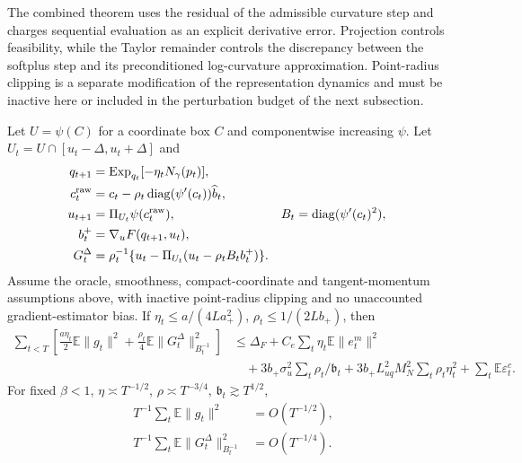 The combined theorem uses the residual of the admissible curvature step and charges sequential evaluation as an explicit derivative error. Projection controls feasibility, while the Taylor remainder controls the discrepancy between the softplus step and its preconditioned log-curvature approximation. Point-radius clipping is a separate modification of the representation dynamics and must be inactive here or included in the perturbation budget of the next subsection.

\begin{theorem}
\label{thm:rigid-implemented-curvature}
Let $U=\psi(C)$ for a coordinate box $C$ and componentwise increasing $\psi$.
Let $U_t=U\cap[u_t-\Delta,u_t+\Delta]$ and
\begin{align}
 q_{t+1}&=\operatorname{Exp}_{q_t}[-\eta_tN_\gamma(p_t)],\\
 c_t^{\rm raw}&=c_t-\rho_t\operatorname{diag}(\psi'(c_t))\widehat b_t,\\
 u_{t+1}&=\Pi_{U_t}\psi(c_t^{\rm raw}),&
 B_t&=\operatorname{diag}(\psi'(c_t)^2),\\
 b_t^+&=\nabla_uF(q_{t+1},u_t),\\
 G_t^\Delta&=\rho_t^{-1}\{u_t-\Pi_{U_t}(u_t-\rho_tB_tb_t^+)\}.
\end{align}
Assume the oracle, smoothness, compact-coordinate and tangent-momentum assumptions above, with inactive point-radius clipping and no unaccounted gradient-estimator bias. If
$\eta_t\le a/(4La_+^2)$, $\rho_t\le1/(2Lb_+)$, then
\begin{align}
 \sum_{t<T}\left[\tfrac{a\eta_t}{2}\mathbb E\|g_t\|^2+
 \tfrac{\rho_t}{4}\mathbb E\|G_t^\Delta\|_{B_t^{-1}}^2\right]
 &\le\Delta_F+C_e\sum_t\eta_t\mathbb E\|e_t^m\|^2\\
 &\quad+3b_+\sigma_u^2\sum_t\rho_t/\mathfrak b_t
 +3b_+L_{uq}^2M_N^2\sum_t\rho_t\eta_t^2
 +\sum_t\mathbb E\varepsilon_t^c.
\end{align}
For fixed $\beta<1$, $\eta\asymp T^{-1/2}$, $\rho\asymp T^{-3/4}$,
$\mathfrak b_t\gtrsim T^{1/2}$,
\begin{align}
 T^{-1}\sum_t\mathbb E\|g_t\|^2&=O(T^{-1/2}),\\
 T^{-1}\sum_t\mathbb E\|G_t^\Delta\|_{B_t^{-1}}^2&=O(T^{-1/4}).
\end{align}
\end{theorem}
